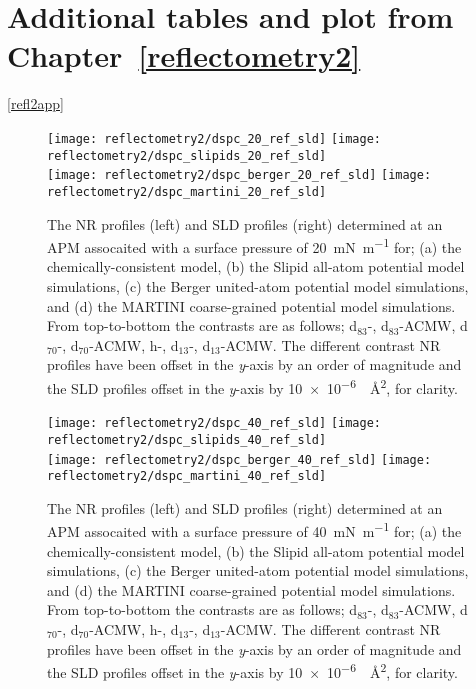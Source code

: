 \chapter{Additional tables and plot from Chapter~\ref{reflectometry2}}

\ref{refl2app}

%
\begin{figure}
    \centering
    \texttt{[image: reflectometry2/dspc\_20\_ref\_sld]}
    \texttt{[image: reflectometry2/dspc\_slipids\_20\_ref\_sld]}\\
    \texttt{[image: reflectometry2/dspc\_berger\_20\_ref\_sld]}
    \texttt{[image: reflectometry2/dspc\_martini\_20\_ref\_sld]}
    \caption{The NR profiles (left) and SLD profiles (right) determined at an APM assocaited with a surface pressure of \SI{20}{\milli\newton\per\meter} for; (a) the chemically-consistent model, (b) the Slipid all-atom potential model simulations, (c) the Berger united-atom potential model simulations, and (d) the MARTINI coarse-grained potential model simulations. From top-to-bottom the contrasts are as follows; d$_{83}$-, d$_{83}$-ACMW, d$_{70}$-, d$_{70}$-ACMW, h-, d$_{13}$-, d$_{13}$-ACMW. The different contrast NR profiles have been offset in the \emph{y}-axis by an order of magnitude and the SLD profiles offset in the \emph{y}-axis by \SI{10e-6}{\per\angstrom\squared}, for clarity.}
    \label{fig:dspcccref30}
\end{figure}
%
%
\begin{figure}
    \centering
    \texttt{[image: reflectometry2/dspc\_40\_ref\_sld]}
    \texttt{[image: reflectometry2/dspc\_slipids\_40\_ref\_sld]}\\
    \texttt{[image: reflectometry2/dspc\_berger\_40\_ref\_sld]}
    \texttt{[image: reflectometry2/dspc\_martini\_40\_ref\_sld]}
    \caption{The NR profiles (left) and SLD profiles (right) determined at an APM assocaited with a surface pressure of \SI{40}{\milli\newton\per\meter} for; (a) the chemically-consistent model, (b) the Slipid all-atom potential model simulations, (c) the Berger united-atom potential model simulations, and (d) the MARTINI coarse-grained potential model simulations. From top-to-bottom the contrasts are as follows; d$_{83}$-, d$_{83}$-ACMW, d$_{70}$-, d$_{70}$-ACMW, h-, d$_{13}$-, d$_{13}$-ACMW. The different contrast NR profiles have been offset in the \emph{y}-axis by an order of magnitude and the SLD profiles offset in the \emph{y}-axis by \SI{10e-6}{\per\angstrom\squared}, for clarity.}
    \label{fig:dspcccref30}
\end{figure}
